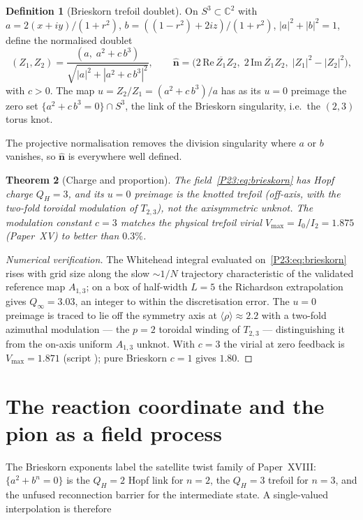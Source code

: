 \documentclass[11pt,a4paper]{article}
\newtheorem{theorem}{Theorem}[section]
\theoremstyle{definition}\newtheorem{definition}[theorem]{Definition}
\newcommand{\QH}{Q_H}
\newcommand{\nhat}{\hat{\mathbf{n}}}
\begin{document}
\begin{definition}[Brieskorn trefoil doublet]
\label{P23:def:brieskorn}
On $S^3\subset\mathbb{C}^2$ with $a=2(x+iy)/(1+r^2)$, $b=((1-r^2)+2iz)/(1+r^2)$,
$|a|^2+|b|^2=1$, define the normalised doublet
\begin{equation}
  (Z_1,Z_2)=\frac{(a,\;a^2+c\,b^3)}{\sqrt{|a|^2+|a^2+c\,b^3|^2}},\qquad
  \nhat=\bigl(2\,\mathrm{Re}\,\overline{Z_1}Z_2,\;2\,\mathrm{Im}\,\overline{Z_1}Z_2,\;
  |Z_1|^2-|Z_2|^2\bigr),
  \label{P23:eq:brieskorn}
\end{equation}
with $c>0$. The map $u=Z_2/Z_1=(a^2+c\,b^3)/a$ has as its $u=0$ preimage the zero set
$\{a^2+c\,b^3=0\}\cap S^3$, the link of the Brieskorn singularity, i.e.\ the $(2,3)$ torus knot.
\end{definition}

The projective normalisation removes the division singularity where $a$ or $b$ vanishes, so
$\nhat$ is everywhere well defined.

\begin{theorem}[Charge and proportion]
\label{P23:thm:charge}
The field~\eqref{P23:eq:brieskorn} has Hopf charge $\QH=3$, and its $u=0$ preimage is the knotted
trefoil (off-axis, with the two-fold toroidal modulation of $T_{2,3}$), not the axisymmetric
unknot. The modulation constant $c=3$ matches the physical trefoil virial $V_{\max}=I_0/I_2=1.875$
(Paper~XV) to better than $0.3\%$.
\end{theorem}

\begin{proof}[Numerical verification]
The Whitehead integral evaluated on~\eqref{P23:eq:brieskorn} rises with grid size along the
slow $\sim1/N$ trajectory characteristic of the validated reference map $A_{1,3}$; on a box of
half-width $L=5$ the Richardson extrapolation gives $Q_\infty=3.03$, an integer to within the
discretisation error. The $u=0$ preimage is traced to lie off the symmetry axis at
$\langle\rho\rangle\approx2.2$ with a two-fold azimuthal modulation --- the $p=2$ toroidal
winding of $T_{2,3}$ --- distinguishing it from the on-axis uniform $A_{1,3}$ unknot. With $c=3$
the virial at zero feedback is $V_{\max}=1.871$ (script ); pure Brieskorn
$c=1$ gives $1.80$.
\end{proof}

\section{The reaction coordinate and the pion as a field process}
\label{P23:sec:barrier}
The Brieskorn exponents label the satellite twist family of Paper~XVIII: $\{a^2+b^n=0\}$ is the
$\QH=2$ Hopf link for $n=2$, the $\QH=3$ trefoil for $n=3$, and the unfused reconnection barrier
for the intermediate state. A single-valued interpolation is therefore
\end{document}
